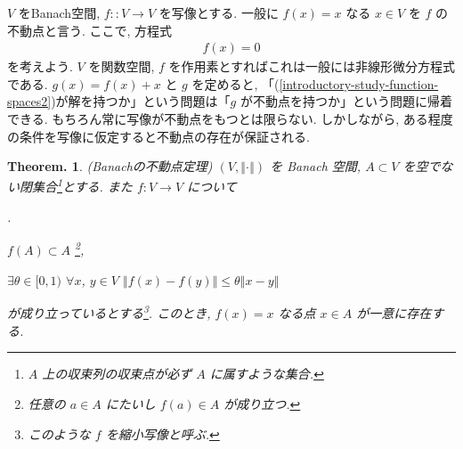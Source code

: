 \documentclass[openany, a4paper, oneside]{jsbook}
\newcounter{enum2}
\renewenvironment{enumerate}{%
\begin{list}%
{%
\arabic{enum2}.\ \,%
}%
{%
\usecounter{enum2}
\setlength{\itemindent}{0pt}%
\setlength{\leftmargin}{15pt}%
\setlength{\rightmargin}{0pt}%
\setlength{\labelsep}{0pt}%
\setlength{\labelwidth}{6pt}%
\setlength{\itemsep}{0pt}%
\setlength{\parsep}{0pt}%
\setlength{\listparindent}{0pt}%
}
}{%
\end{list}%
}
\theoremstyle{break}
\newtheorem{thm}{Theorem.}[section]
\theoremstyle{breakdefn}
\newcommand{\norm}[1]{\left\Vert#1\right\Vert}
\begin{document}
$V$ をBanach空間, $f \colon :V \to V$ を写像とする.
一般に $f(x)=x$ なる $x\in V$ を $f$ の不動点と言う.
ここで, 方程式
\begin{align}
 f(x)=0 \label{introductory-study-function-spaces2}
\end{align}
を考えよう.
$V$ を関数空間, $f$ を作用素とすればこれは一般には非線形微分方程式である.
$g(x) = f(x) + x$ と $g$ を定めると, 「(\ref{introductory-study-function-spaces2})が解を持つか」という問題は「$g$ が不動点を持つか」という問題に帰着できる.
もちろん常に写像が不動点をもつとは限らない.
しかしながら, ある程度の条件を写像に仮定すると不動点の存在が保証される.
\begin{thm}(Banachの不動点定理)
 $(V, \norm{\cdot})$ を Banach 空間, $A \subset V$ を空でない閉集合\footnote{$A$ 上の収束列の収束点が必ず $A$ に属すような集合.}とする.
 また $f \colon V\to V$ について
\begin{enumerate}
\item $f(A) \subset A$ \footnote{任意の $a\in A$ にたいし $f(a)\in A$ が成り立つ.},
\item $\exists \theta \in[0, 1)$ $\forall x$, $y \in V$ $\norm{f(x)-f(y)} \leq \theta \norm{x - y}$
\end{enumerate}
 が成り立っているとする\footnote{このような $f$ を縮小写像と呼ぶ.}.
 このとき, $f(x) = x$ なる点 $x \in A$ が一意に存在する.
\end{thm}
\end{document}
